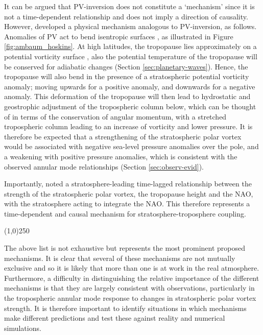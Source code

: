 It can be argued that PV-inversion does not constitute a `mechanism' since it is
not a time-dependent relationship and does not imply a direction of
causality. However, \citet{Ambaum2002} developed a physical mechanism analogous
to PV-inversion, as follows. Anomalies of PV act to bend isentropic surfaces
\citep{Hoskins1985}, as illustrated in Figure \ref{fig:ambaum_hoskins}. At high
latitudes, the tropopause lies approximately on a potential vorticity surface
\citep{Hoerling1991}, also the potential temperature of the tropopause will be
conserved for adiabatic changes (Section \ref{sec:planetary-waves}). Hence, the
tropopause will also bend in the presence of a stratospheric potential vorticity
anomaly; moving upwards for a positive anomaly, and downwards for a negative
anomaly. This deformation of the tropopause will then lead to hydrostatic and
geostrophic adjustment of the tropospheric column below, which can be thought of
in terms of the conservation of angular momentum, with a stretched tropospheric
column leading to an increase of vorticity and lower pressure. It is therefore
be expected that a strengthening of the stratospheric polar vortex would be
associated with negative sea-level pressure anomalies over the pole, and a
weakening with positive pressure anomalies, which is consistent with the
observed annular mode relationships (Section \ref{sec:observ-evid}).

Importantly, \citet{Ambaum2002} noted a stratosphere-leading time-lagged
relationship between the strength of the stratospheric polar vortex, the
tropopause height and the NAO, with the stratosphere acting to integrate the
NAO. This therefore represents a time-dependent and causal mechanism for
stratosphere-troposphere coupling.
\begin{center}
\line(1,0){250}
\end{center}

\bigskip The above list is not exhaustive but represents the most prominent
proposed mechanisms. It is clear that several of these mechanisms are not
mutually exclusive and so it is likely that more than one is at work in the real
atmosphere. Furthermore, a difficulty in distinguishing the relative importance
of the different mechanisms is that they are largely consistent with
observations, particularly in the tropospheric annular mode response to changes
in stratospheric polar vortex strength. It is therefore important to identify
situations in which mechanisms make different predictions and test these against
reality and numerical simulations.

